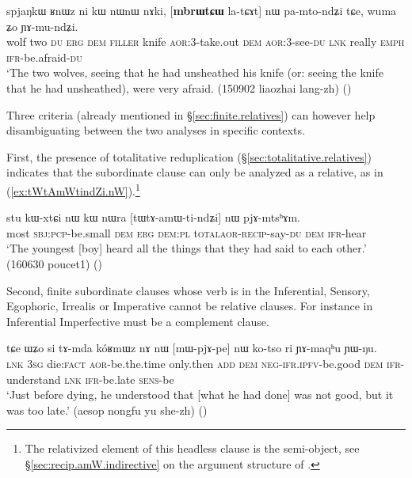 \begin{exe}
\ex \label{ex:mbrWtCW.latCAt.nW}
\gll spjaŋkɯ ʁnɯz ni kɯ nɯnɯ nɤki, [\textbf{mbrɯtɕɯ} la-tɕɤt] nɯ pa-mto-ndʑi tɕe, wuma ʑo ɲɤ-mu-ndʑi. \\
wolf two \textsc{du} \textsc{erg} \textsc{dem} \textsc{filler} knife \textsc{aor}:3\flobv{}-take.out \textsc{dem} \textsc{aor}:3\flobv{}-see-\textsc{du} \textsc{lnk} really \textsc{emph} \textsc{ifr}-be.afraid-\textsc{du} \\
\glt `The two wolves, seeing that he had unsheathed his knife (or: seeing the knife that he had unsheathed), were very afraid. (150902 liaozhai lang-zh)
()
\end{exe}

Three criteria (already mentioned in §\ref{sec:finite.relatives}) can however help disambiguating between the two analyses in specific contexts. 

First, the presence of totalitative reduplication (§\ref{sec:totalitative.relatives}) indicates that the subordinate clause can only be analyzed as a relative, as in (\ref{ex:tWtAmWtindZi.nW}).\footnote{The relativized element of this headless clause is the semi-object, see §\ref{sec:recip.amW.indirective} on the argument structure of . }
 
\begin{exe}
\ex \label{ex:tWtAmWtindZi.nW}
\gll  stu kɯ-xtɕi nɯ kɯ nɯra [tɯ\redp{}tɤ-amɯ-ti-ndʑi] nɯ pjɤ-mtsʰɤm. \\
most \textsc{sbj}:\textsc{pcp}-be.small \textsc{dem} \textsc{erg} \textsc{dem}:\textsc{pl} t\textsc{otal}\redp{}\textsc{aor}-\textsc{recip}-say-\textsc{du} \textsc{dem} \textsc{ifr}-hear \\
\glt `The youngest [boy] heard all the things that they had said to each other.' (160630 poucet1)
()
\end{exe}

Second, finite subordinate clauses whose verb is in the Inferential, Sensory, Egophoric, Irrealis or Imperative cannot be relative clauses. For instance  in Inferential Imperfective must be a complement clause.

\begin{exe}
\ex \label{ex:mWpjApe.nW.kotso}
\gll tɕe ɯʑo si tɤ-mda kóʁmɯz nɤ nɯ [mɯ-pjɤ-pe] nɯ ko-tso ri ɲɤ-maqʰu ɲɯ-ŋu. \\
\textsc{lnk} \textsc{3sg} die:\textsc{fact} \textsc{aor}-be.the.time only.then \textsc{add} \textsc{dem} \textsc{neg}-\textsc{ifr}.\textsc{ipfv}-be.good \textsc{dem} \textsc{ifr}-understand \textsc{lnk} \textsc{ifr}-be.late \textsc{sens}-be \\
\glt  `Just before dying, he understood that [what he had done] was not good, but it was too late.' (aesop nongfu yu she-zh)
()
\end{exe}

